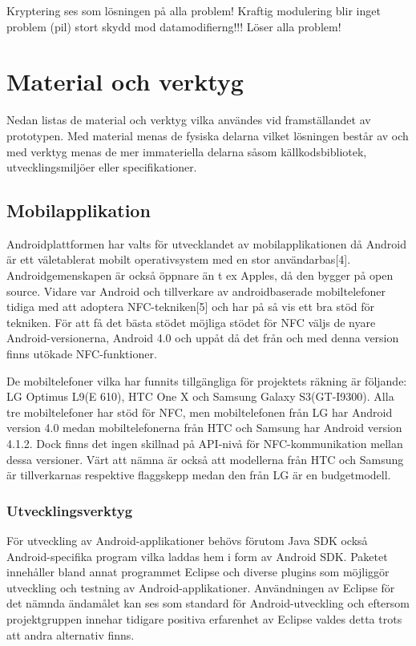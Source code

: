 \documentclass[11pt]{article}
\begin{document}
Kryptering ses som lösningen på alla problem! Kraftig modulering blir inget problem (pil) stort skydd mod datamodifierng!!! Löser alla problem!  

\section{Material och verktyg}
Nedan listas de material och verktyg vilka användes vid framställandet av prototypen. Med material menas de fysiska delarna vilket lösningen består av och med verktyg menas de mer immateriella delarna såsom källkodsbibliotek, utvecklingsmiljöer eller specifikationer.

\subsection{Mobilapplikation}
Androidplattformen har valts för utvecklandet av mobilapplikationen då Android är ett väletablerat mobilt operativsystem med en stor användarbas[4]. Androidgemenskapen är också öppnare än t ex Apples, då den bygger på open source. Vidare var Android och tillverkare av androidbaserade mobiltelefoner tidiga med att adoptera NFC-tekniken[5] och har på så vis ett bra stöd för tekniken. För att få det bästa stödet möjliga stödet för NFC väljs de nyare Android-versionerna, Android 4.0 och uppåt då det från och med denna version finns utökade NFC-funktioner.

De mobiltelefoner vilka har funnits tillgängliga för projektets räkning är följande: LG Optimus L9(E 610),  HTC One X och Samsung Galaxy S3(GT-I9300). Alla tre mobiltelefoner har stöd för NFC, men mobiltelefonen från LG har Android version 4.0 medan mobiltelefonerna från HTC och Samsung har Android version 4.1.2. Dock finns det ingen skillnad på API-nivå för NFC-kommunikation mellan dessa versioner. Värt att nämna är också att modellerna från HTC och Samsung är tillverkarnas respektive flaggskepp medan den från LG är en budgetmodell.

\subsubsection{Utvecklingsverktyg}
För utveckling av Android-applikationer behövs förutom Java SDK också Android-specifika program vilka laddas hem i form av Android SDK. Paketet innehåller bland annat programmet Eclipse och diverse plugins som möjliggör utveckling och testning av Android-applikationer. Användningen av Eclipse för det nämnda ändamålet kan ses som standard för Android-utveckling och eftersom projektgruppen innehar tidigare positiva erfarenhet av Eclipse valdes detta trots att andra alternativ finns.
\end{document}

